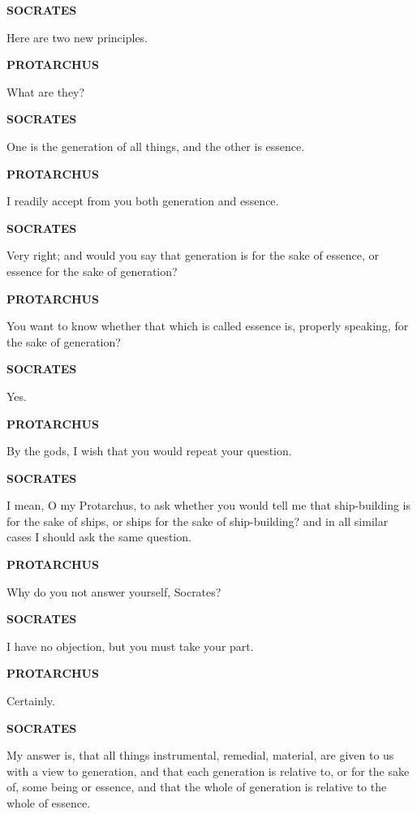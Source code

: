 \documentclass[11pt,letter]{article}
\begin{document}
\par \textbf{SOCRATES}
\par   Here are two new principles.

\par \textbf{PROTARCHUS}
\par   What are they?

\par \textbf{SOCRATES}
\par   One is the generation of all things, and the other is essence.

\par \textbf{PROTARCHUS}
\par   I readily accept from you both generation and essence.

\par \textbf{SOCRATES}
\par   Very right; and would you say that generation is for the sake of essence, or essence for the sake of generation?

\par \textbf{PROTARCHUS}
\par   You want to know whether that which is called essence is, properly speaking, for the sake of generation?

\par \textbf{SOCRATES}
\par   Yes.

\par \textbf{PROTARCHUS}
\par   By the gods, I wish that you would repeat your question.

\par \textbf{SOCRATES}
\par   I mean, O my Protarchus, to ask whether you would tell me that ship-building is for the sake of ships, or ships for the sake of ship-building? and in all similar cases I should ask the same question.

\par \textbf{PROTARCHUS}
\par   Why do you not answer yourself, Socrates?

\par \textbf{SOCRATES}
\par   I have no objection, but you must take your part.

\par \textbf{PROTARCHUS}
\par   Certainly.

\par \textbf{SOCRATES}
\par   My answer is, that all things instrumental, remedial, material, are given to us with a view to generation, and that each generation is relative to, or for the sake of, some being or essence, and that the whole of generation is relative to the whole of essence.
\end{document}
